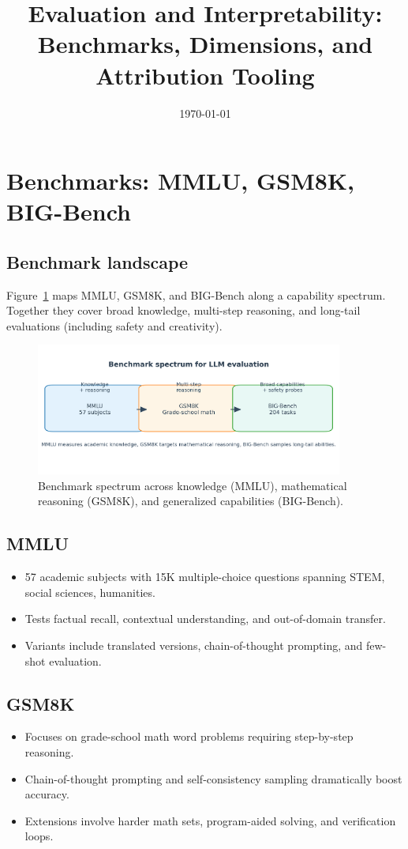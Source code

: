 \documentclass{article}
\title{Evaluation and Interpretability: Benchmarks, Dimensions, and Attribution Tooling}
\author{}
\date{\today}
\begin{document}
\maketitle

\section{Benchmarks: MMLU, GSM8K, BIG-Bench}
\subsection{Benchmark landscape}
Figure~\ref{fig:benchmark_landscape_en} maps MMLU, GSM8K, and BIG-Bench along a capability spectrum. Together they cover broad knowledge, multi-step reasoning, and long-tail evaluations (including safety and creativity).
\begin{figure}[H]
  \centering
  \includegraphics[width=0.9\textwidth]{benchmark_landscape.png}
  \caption{Benchmark spectrum across knowledge (MMLU), mathematical reasoning (GSM8K), and generalized capabilities (BIG-Bench).}
  \label{fig:benchmark_landscape_en}
\end{figure}

\subsection{MMLU}
\begin{itemize}
  \item 57 academic subjects with 15K multiple-choice questions spanning STEM, social sciences, humanities.
  \item Tests factual recall, contextual understanding, and out-of-domain transfer.
  \item Variants include translated versions, chain-of-thought prompting, and few-shot evaluation.
\end{itemize}

\subsection{GSM8K}
\begin{itemize}
  \item Focuses on grade-school math word problems requiring step-by-step reasoning.
  \item Chain-of-thought prompting and self-consistency sampling dramatically boost accuracy.
  \item Extensions involve harder math sets, program-aided solving, and verification loops.
\end{itemize}
\end{document}

